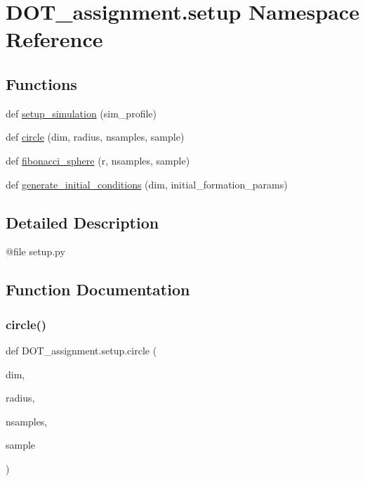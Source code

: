 \hypertarget{namespace_d_o_t__assignment_1_1setup}{}\section{D\+O\+T\+\_\+assignment.\+setup Namespace Reference}
\label{namespace_d_o_t__assignment_1_1setup}
\subsection*{Functions}
\begin{DoxyCompactItemize}
\item 
def \mbox{\hyperlink{namespace_d_o_t__assignment_1_1setup_ab207d233471df2264b7906939e447e2f}{setup\+\_\+simulation}} (sim\+\_\+profile)
\item 
def \mbox{\hyperlink{namespace_d_o_t__assignment_1_1setup_af7f0dc8b8fe1bf260616c7184ff94ddf}{circle}} (dim, radius, nsamples, sample)
\item 
def \mbox{\hyperlink{namespace_d_o_t__assignment_1_1setup_a7e2f8ba24cedf939649b3cd695c303f4}{fibonacci\+\_\+sphere}} (r, nsamples, sample)
\item 
def \mbox{\hyperlink{namespace_d_o_t__assignment_1_1setup_a8beda6cfa86fe6bed2f106b9a340637b}{generate\+\_\+initial\+\_\+conditions}} (dim, initial\+\_\+formation\+\_\+params)
\end{DoxyCompactItemize}


\subsection{Detailed Description}
\begin{DoxyVerb}@file setup.py
\end{DoxyVerb}
 

\subsection{Function Documentation}
\mbox{\label{namespace_d_o_t__assignment_1_1setup_af7f0dc8b8fe1bf260616c7184ff94ddf}} 
\subsubsection{\texorpdfstring{circle()}{circle()}}
{\footnotesize\ttfamily def D\+O\+T\+\_\+assignment.\+setup.\+circle (\begin{DoxyParamCaption}\item[{}]{dim,  }\item[{}]{radius,  }\item[{}]{nsamples,  }\item[{}]{sample }\end{DoxyParamCaption})}

